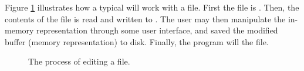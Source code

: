 
Figure \ref{fig:bg:processes:edit} illustrates how a typical  will work with a file. First the file is . Then, the contents of the file is read and written to . The user may then manipulate the in-memory representation through some user interface, and saved the modified buffer (memory representation) to disk. Finally, the program will  the file.

\begin{figure}[tbp]
  
  \caption{The process of editing a file.}
  \label{fig:bg:processes:edit}
\end{figure}

